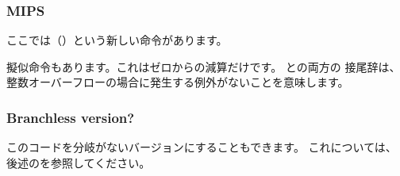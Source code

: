 

\subsubsection{MIPS}



ここでは（）という新しい命令があります。

擬似命令もあります。これはゼロからの減算だけです。 
との両方の 接尾辞は、整数オーバーフローの場合に発生する例外がないことを意味します。

\subsubsection{Branchless version?}

このコードを分岐がないバージョンにすることもできます。 これについては、後述のを参照してください。
